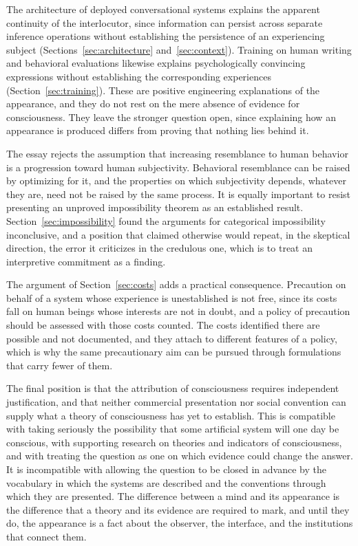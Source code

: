\documentclass[12pt]{article}
\theoremstyle{definition}
\begin{document}
The architecture of deployed conversational systems explains the apparent continuity of the interlocutor, since information can persist across separate inference operations without establishing the persistence of an experiencing subject (Sections~\ref{sec:architecture} and~\ref{sec:context}). Training on human writing and behavioral evaluations likewise explains psychologically convincing expressions without establishing the corresponding experiences (Section~\ref{sec:training}). These are positive engineering explanations of the appearance, and they do not rest on the mere absence of evidence for consciousness. They leave the stronger question open, since explaining how an appearance is produced differs from proving that nothing lies behind it.

The essay rejects the assumption that increasing resemblance to human behavior is a progression toward human subjectivity. Behavioral resemblance can be raised by optimizing for it, and the properties on which subjectivity depends, whatever they are, need not be raised by the same process. It is equally important to resist presenting an unproved impossibility theorem as an established result. Section~\ref{sec:impossibility} found the arguments for categorical impossibility inconclusive, and a position that claimed otherwise would repeat, in the skeptical direction, the error it criticizes in the credulous one, which is to treat an interpretive commitment as a finding.

The argument of Section~\ref{sec:costs} adds a practical consequence. Precaution on behalf of a system whose experience is unestablished is not free, since its costs fall on human beings whose interests are not in doubt, and a policy of precaution should be assessed with those costs counted. The costs identified there are possible and not documented, and they attach to different features of a policy, which is why the same precautionary aim can be pursued through formulations that carry fewer of them.

The final position is that the attribution of consciousness requires independent justification, and that neither commercial presentation nor social convention can supply what a theory of consciousness has yet to establish. This is compatible with taking seriously the possibility that some artificial system will one day be conscious, with supporting research on theories and indicators of consciousness, and with treating the question as one on which evidence could change the answer. It is incompatible with allowing the question to be closed in advance by the vocabulary in which the systems are described and the conventions through which they are presented. The difference between a mind and its appearance is the difference that a theory and its evidence are required to mark, and until they do, the appearance is a fact about the observer, the interface, and the institutions that connect them.
\end{document}
